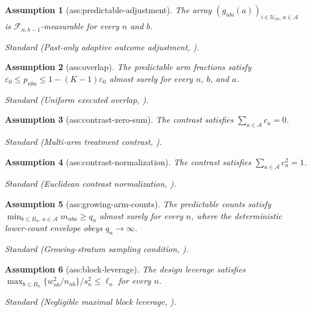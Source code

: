 \documentclass{article}
\newtheorem{assumption}{Assumption}
\begin{document}
\begin{assumption}[ass:predictable-adjustment]\label{ass:predictable-adjustment}
The array \((g_{nbi}(a))_{i\in\mathcal U_{nb},\,a\in\mathcal A}\) is \(\mathcal F_{n,b-1}\)-measurable for every \(n\) and \(b\).
\par\smallskip\noindent\emph{Standard} (Past-only adaptive outcome adjustment, \cite{LiZhao2026AdaptiveDesignBased}).
\end{assumption}

\begin{assumption}[ass:overlap]\label{ass:overlap}
The predictable arm fractions satisfy \(\varepsilon_0\le p_{nba}\le1-(K-1)\varepsilon_0\) almost surely for every \(n\), \(b\), and \(a\).
\par\smallskip\noindent\emph{Standard} (Uniform executed overlap, \cite{LiZhao2026AdaptiveDesignBased}).
\end{assumption}

\begin{assumption}[ass:contrast-zero-sum]\label{ass:contrast-zero-sum}
The contrast satisfies \(\sum_{a\in\mathcal A}c_a=0\).
\par\smallskip\noindent\emph{Standard} (Multi-arm treatment contrast, \cite{GaoGeQian2025MOT}).
\end{assumption}

\begin{assumption}[ass:contrast-normalization]\label{ass:contrast-normalization}
The contrast satisfies \(\sum_{a\in\mathcal A}c_a^2=1\).
\par\smallskip\noindent\emph{Standard} (Euclidean contrast normalization, \cite{GaoGeQian2025MOT}).
\end{assumption}

\begin{assumption}[ass:growing-arm-counts]\label{ass:growing-arm-counts}
The predictable counts satisfy \(\min_{b\le B_n,\,a\in\mathcal A}m_{nba}\ge q_n\) almost surely for every \(n\), where the deterministic lower-count envelope obeys \(q_n\to\infty\).
\par\smallskip\noindent\emph{Standard} (Growing-stratum sampling condition, \cite{YuZhuLiu2025SharpStratified}).
\end{assumption}

\begin{assumption}[ass:block-leverage]\label{ass:block-leverage}
The design leverage satisfies \(\max_{b\le B_n}\{w_{nb}^2/n_{nb}\}/s_n^2\le\ell_n\) for every \(n\).
\par\smallskip\noindent\emph{Standard} (Negligible maximal block leverage, \cite{LiZhao2026AdaptiveDesignBased}).
\end{assumption}
\end{document}
